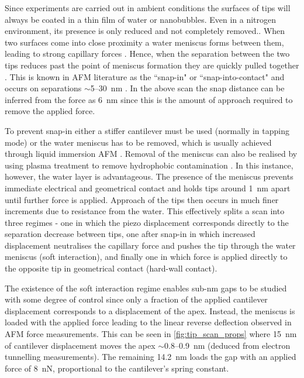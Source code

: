 \documentclass[a4paper]{article}
\begin{document}
Since experiments are carried out in ambient conditions the surfaces of tips will always be coated in a thin film of water or nanobubbles. Even in a nitrogen environment, its presence is only reduced and not completely removed.. When two surfaces come into close proximity a water meniscus forms between them, leading to strong capillary forces \cite{gan2009atomic}. Hence, when the separation between the two tips reduces past the point of meniscus formation they are quickly pulled together \cite{holmberg2003}. This is known in AFM literature as the ``snap-in" or ``snap-into-contact" and occurs on separations $\sim$5--\SI{30}{nm} \cite{holmberg2003, song2014}. In the above scan the snap distance can be inferred from the force as \SI{6}{nm} since this is the amount of approach required to remove the applied force.

To prevent snap-in either a stiffer cantilever must be used (normally in tapping mode) \cite{zhong1993fractured} or the water meniscus has to be removed, which is usually achieved through liquid immersion AFM \cite{hansma1994tapping, putman1994tapping, song2014}. Removal of the meniscus can also be realised by using plasma treatment to remove hydrophobic contamination \cite{song2014}. In this instance, however, the water layer is advantageous. The presence of the meniscus prevents immediate electrical and geometrical contact and holds tips around \SI{1}{nm} apart until further force is applied. Approach of the tips then occurs in much finer increments due to resistance from the water. This effectively splits a scan into three regimes - one in which the piezo displacement corresponds directly to the separation decrease between tips, one after snap-in in which increased displacement neutralises the capillary force and pushes the tip through the water meniscus (soft interaction), and finally one in which force is applied directly to the opposite tip in geometrical contact (hard-wall contact).

The existence of the soft interaction regime enables sub-nm gaps to be studied with some degree of control since only a fraction of the applied cantilever displacement corresponds to a displacement of the apex. Instead, the meniscus is loaded with the applied force leading to the linear reverse deflection observed in AFM force measurements. This can be seen in \autoref{fig:tip_scan_props} where \SI{15}{nm} of cantilever displacement moves the apex $\sim$0.8--\SI{0.9}{nm} (deduced from electron tunnelling measurements). The remaining \SI{14.2}{nm} loads the gap with an applied force of \SI{8}{nN}, proportional to the cantilever's spring constant.
\end{document}
